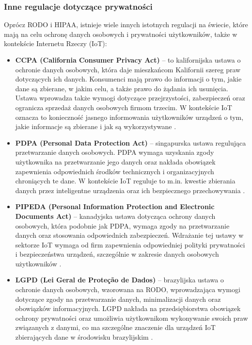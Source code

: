 \subsubsection{Inne regulacje dotyczące prywatności}

Oprócz RODO i HIPAA, istnieje wiele innych istotnych regulacji na świecie, które mają na celu ochronę danych osobowych i prywatności użytkowników, także w kontekście Internetu Rzeczy (IoT):

\begin{itemize}

\item \textbf{CCPA (California Consumer Privacy Act)} – to kalifornijska ustawa o ochronie danych osobowych, która daje mieszkańcom Kalifornii szereg praw dotyczących ich danych. Konsumenci mają prawo do informacji o tym, jakie dane są zbierane, w jakim celu, a także prawo do żądania ich usunięcia. Ustawa wprowadza także wymogi dotyczące przejrzystości, zabezpieczeń oraz ogranicza sprzedaż danych osobowych firmom trzecim. W kontekście IoT oznacza to konieczność jasnego informowania użytkowników urządzeń o tym, jakie informacje są zbierane i jak są wykorzystywane \cite{ccpa}.

\item \textbf{PDPA (Personal Data Protection Act)} – singapurska ustawa regulująca przetwarzanie danych osobowych. PDPA wymaga uzyskania zgody użytkownika na przetwarzanie jego danych oraz nakłada obowiązek zapewnienia odpowiednich środków technicznych i organizacyjnych chroniących te dane. W kontekście IoT reguluje to m.in. kwestie zbierania danych przez inteligentne urządzenia oraz ich bezpiecznego przechowywania \cite{pdpa}.

\item \textbf{PIPEDA (Personal Information Protection and Electronic Documents Act)} – kanadyjska ustawa dotycząca ochrony danych osobowych, która podobnie jak PDPA, wymaga zgody na przetwarzanie danych oraz stosowania odpowiednich zabezpieczeń. Wdrażanie tej ustawy w sektorze IoT wymaga od firm zapewnienia odpowiedniej polityki prywatności i bezpieczeństwa urządzeń, szczególnie w zakresie danych osobowych użytkowników \cite{pipeda}.

\item \textbf{LGPD (Lei Geral de Proteção de Dados)} – brazylijska ustawa o ochronie danych osobowych, wzorowana na RODO, wprowadzająca wymogi dotyczące zgody na przetwarzanie danych, minimalizacji danych oraz obowiązków informacyjnych. LGPD nakłada na przedsiębiorstwa obowiązek ochrony prywatności oraz umożliwia użytkownikom wykonywanie swoich praw związanych z danymi, co ma szczególne znaczenie dla urządzeń IoT zbierających dane w środowisku brazylijskim \cite{lgpd}.


\end{itemize}
